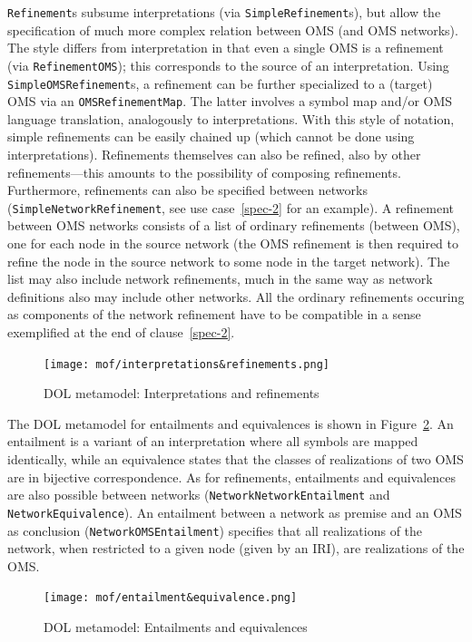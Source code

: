 \documentclass[10pt, a4paper]{isov2}
\newcommand*{\syntax}[1]{\texttt{#1}}
\begin{document}
\syntax{Refinement}s subsume interpretations (via
\syntax{SimpleRefinement}s), but allow the specification of much more
complex relation between OMS (and OMS networks).  The style differs
from interpretation in that even a single OMS is a refinement (via
\syntax{RefinementOMS}); this corresponds to the source of an
interpretation. Using \syntax{SimpleOMSRefinement}s, a refinement can
be further specialized to a (target) OMS via an
\syntax{OMSRefinementMap}. The latter involves a symbol map and/or OMS
language translation, analogously to interpretations.  With this style
of notation, simple refinements can be easily chained up (which cannot
be done using interpretations).  Refinements themselves can
also be refined, also by other refinements---this amounts
to the possibility of composing refinements. Furthermore,
refinements can also be specified between networks
(\syntax{SimpleNetworkRefinement}, see use case~\ref{spec-2} for an example).
A refinement between OMS networks
consists of a list of ordinary refinements (between OMS), one for
each node in the source network (the OMS refinement is then required
to refine the node in the source network to some node in the target
network). The list may also include network refinements, much in the
same way as network definitions also may include other networks.
All the ordinary refinements occuring as components of the
network refinement have to be compatible in a sense exemplified
at the end of clause~\ref{spec-2}.

\medskip
\begin{figure}
  \centering
    \texttt{[image: mof/interpretations\&refinements.png]}
  \caption{DOL metamodel: Interpretations and refinements}
  \label{fig:interpretations&refinements}
\end{figure}

The DOL metamodel for entailments and equivalences is shown in
Figure~\ref{fig:entailment&equivalence}.
An entailment is a variant of an interpretation where all symbols are
mapped identically, while an equivalence states that the classes of realizations
of two OMS are in bijective correspondence. As for refinements,
entailments and equivalences are also possible between networks
(\syntax{NetworkNetworkEntailment} and \syntax{NetworkEquivalence}).
An entailment between a network as premise and an OMS as conclusion
(\syntax{NetworkOMSEntailment}) specifies that all realizations of the
network, when restricted to a given node (given by an IRI), are
realizations of the OMS.

\begin{figure}
  \centering
    \texttt{[image: mof/entailment\&equivalence.png]}
  \caption{DOL metamodel: Entailments and equivalences}
  \label{fig:entailment&equivalence}
\end{figure}
\end{document}
